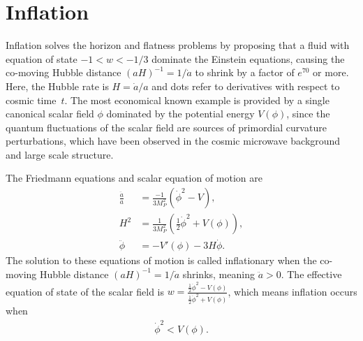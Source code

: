 \documentclass[aps,amsfonts,amsmath,prd,preprint,nofootinbib,superscriptaddress]{revtex4}
\newcommand{\MMp}{{M_P^2}}
\begin{document}
\section{Inflation}
Inflation solves the horizon and flatness problems \cite{guth} by proposing that a fluid with equation of state $-1< w < -1/3$ dominate the Einstein equations, 
causing the co-moving Hubble distance $(a H)^{-1} = 1/\dot a$ to shrink by a factor of $e^{70}$ or more. 
Here, the Hubble rate is $H = \dot a/a$ and dots refer to derivatives with respect to cosmic time~$t$.  
The most economical known example is provided by a single canonical scalar field $\phi$ dominated by the potential energy $V(\phi)$, 
since the quantum fluctuations of the scalar field are sources of primordial curvature perturbations, which have been observed 
in the cosmic microwave background and large scale structure\cite{mukhanov, steinhardt}.  

 
The Friedmann equations and scalar equation of motion are
\begin{align}
\frac{\ddot a}{a} &= \frac{-1}{3\MMp}\left(\dot\phi^2 - V  \right),\\
H^2 &= \frac{1}{3\MMp}\left(\tfrac{1}{2}\dot\phi^2 + V(\phi)\right),\\
\ddot \phi &= -V'(\phi) - 3 H \dot \phi.  \label{eq:scalareom}
\end{align}
The solution to these equations of motion is called inflationary when the co-moving Hubble distance $(a H)^{-1} = 1/\dot a$ shrinks, meaning $\ddot a > 0$. 
The effective equation of state of the scalar field is $w = \frac{\tfrac{1}{2}\dot\phi^2 - V(\phi)}{\tfrac{1}{2}\dot\phi^2 + V(\phi)}$, which means inflation occurs when
\begin{align}
\dot\phi^2 < V(\phi).
\end{align}


\end{document}
